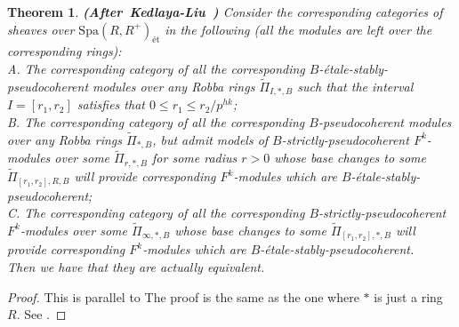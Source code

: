 \documentclass[12pt]{amsart}
\newtheorem{theorem}{Theorem}[section]
\theoremstyle{definition}
\numberwithin{equation}{section}
\begin{document}
\begin{theorem}\mbox{\bf{(After Kedlaya-Liu \cite[Theorem 4.6.1]{KL2})}}
Consider the corresponding categories of sheaves over $\mathrm{Spa}(R,R^+)_{\text{\'et}}$ in the following (all the modules are left over the corresponding rings):\\
A. The corresponding category of all the corresponding $B$-\'etale-stably-pseudocoherent modules over any Robba rings $\widetilde{\Pi}_{I,*,B}$ such that the interval $I=[r_1,r_2]$ satisfies that $0\leq r_1 \leq r_2/p^{hk}$;\\
B. The corresponding category of all the corresponding $B$-pseudocoherent modules over any Robba rings $\widetilde{\Pi}_{*,B}$, but admit models of $B$-strictly-pseudocoherent $F^k$-modules over some $\widetilde{\Pi}_{r,*,B}$ for some radius $r>0$ whose base changes to some $\widetilde{\Pi}_{[r_1,r_2],R,B}$ will provide corresponding $F^k$-modules which are $B$-\'etale-stably-pseudocoherent;\\
C. The corresponding category of all the corresponding $B$-strictly-pseudocoherent $F^k$-modules over some $\widetilde{\Pi}_{\infty,*,B}$ whose base changes to some $\widetilde{\Pi}_{[r_1,r_2],*,B}$ will provide corresponding $F^k$-modules which are $B$-\'etale-stably-pseudocoherent.\\
Then we have that they are actually equivalent.


\end{theorem}



\begin{proof}
This is parallel to \cite[Theorem 4.6.1]{KL2}The proof is the same as the one where $*$ is just a ring $R$. See \cite[Theorem 4.11]{XT2}.	
\end{proof}
\end{document}
